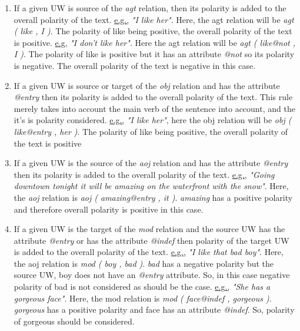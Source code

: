 \begin{enumerate}

\item If a given UW is source of the \textit{agt} relation, then its polarity is added to the overall polarity of the text.
\underline{e.g.,} \textit{"I like her"}. Here, the agt relation will be \textit{agt ( like , I )}. The polarity of like being positive, the overall polarity of the text is positive.
\underline{e.g,} \textit{"I don't like her"}. Here the agt relation will be \textit{agt ( like@not , I )}. The polarity of like is positive but it has an attribute \textit{@not}
so its polarity is negative. The overall polarity of the text is negative in this case. \\
\item If a given UW is source or target of the \textit{obj} relation and has the attribute \textit{@entry} then its polarity is added to the overall polarity of the text. This rule 
merely takes into account the main verb of the sentence into account, and the it's is polarity considered.
\underline{e.g.,} \textit{"I like her"}, here the obj relation will be \textit{obj ( like@entry , her )}. The polarity of like being positive, the overall polarity of the text is positive \\
\item If a given UW is the source of the \textit{aoj} relation and has the attribute \textit{@entry} then its polarity is added to the overall polarity of the text.
\underline{e.g.,} \textit{"Going downtown tonight it will be amazing on the waterfront with the snow"}. Here, the \textit{aoj} relation is \textit{aoj ( amazing@entry , it )}. 
\textit{amazing} has a positive polarity and therefore overall polarity is positive in this case.\\
\item If a given UW is the target of the \textit{mod} relation and the source UW has the attribute \textit{@entry} or has the attribute \textit{@indef} then polarity of the 
target UW is added to the overall polarity of the text.
\underline{e.g.,} \textit{"I like that bad boy"}. Here, the aoj relation is \textit{mod ( boy , bad )}. \textit{bad} has a negative polarity but the source UW, boy does not have an 
\textit{@entry} attribute. So, in this case negative polarity of bad is not considered as should be the case.
\underline{e.g.,} \textit{"She has a gorgeous face"}. Here, the mod relation is \textit{mod ( face@indef , gorgeous )}. \textit{gorgeous} has a positive polarity and face has an 
attribute \textit{@indef}. So, polarity of gorgeous should be considered. \\

\end{enumerate}
